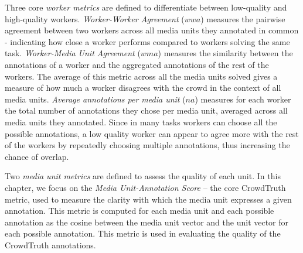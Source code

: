 Three core \textit{worker metrics} are defined to differentiate between low-quality and high-quality workers. \emph{Worker-Worker Agreement} ($wwa$) measures the pairwise agreement between two workers across all media units they annotated in common - indicating how close a worker performs compared to workers solving the same task. \emph{Worker-Media Unit Agreement} ($wma$) measures the similarity between the annotations of a worker and the aggregated annotations of the rest of the workers. The average of this metric across all the media units solved gives a measure of how much a worker disagrees with the crowd in the context of all media units. \emph{Average annotations per media unit} ($na$) measures for each worker the total number of annotations they chose per media unit, averaged across all media units they annotated. Since in many tasks workers can choose all the possible annotations, a low quality worker can appear to agree more with the rest of the workers by repeatedly choosing multiple annotations, thus increasing the chance of overlap.

\begin{table}
	\caption {Consider an open-ended sound annotation task where 10 workers have to describe a given sound with keywords. The media unit for this task is a sound, the annotation set contains all the keywords workers provide for a sound. The table shows the media unit metrics, as well as the majority vote score for the media unit.}
    \label{tab:example_annotation}
\end{table}

Two \textit{media unit metrics} are defined to assess the quality of each unit. In this chapter, we focus on the \emph{Media Unit-Annotation Score} -- the core CrowdTruth metric, used to measure the clarity with which the media unit expresses a given annotation. This metric is computed for each media unit and each possible annotation as the cosine between the media unit vector and the unit vector for each possible annotation.  This metric is used in evaluating the quality of the CrowdTruth annotations.


